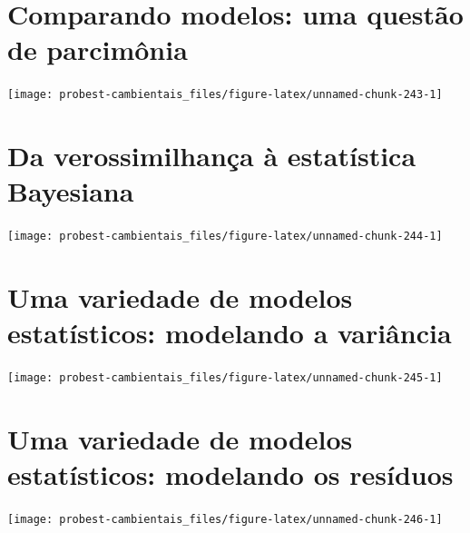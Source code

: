 \documentclass[
]{book}
\begin{document}
\hypertarget{aic}{%
\chapter{Comparando modelos: uma questão de parcimônia}\label{aic}}

\begin{center}\texttt{[image: probest-cambientais\_files/figure-latex/unnamed-chunk-243-1]} \end{center}

\hypertarget{statbayes}{%
\chapter{Da verossimilhança à estatística Bayesiana}\label{statbayes}}

\begin{center}\texttt{[image: probest-cambientais\_files/figure-latex/unnamed-chunk-244-1]} \end{center}

\hypertarget{varmodels}{%
\chapter{Uma variedade de modelos estatísticos: modelando a variância}\label{varmodels}}

\begin{center}\texttt{[image: probest-cambientais\_files/figure-latex/unnamed-chunk-245-1]} \end{center}

\hypertarget{nindep}{%
\chapter{Uma variedade de modelos estatísticos: modelando os resíduos}\label{nindep}}

\begin{center}\texttt{[image: probest-cambientais\_files/figure-latex/unnamed-chunk-246-1]} \end{center}

  
\end{document}
